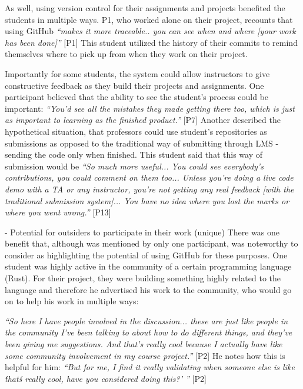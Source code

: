 As well, using version control for their assignments and projects benefited the students in multiple ways. P1, who worked alone on their project, recounts that using GitHub \textit{``makes it more traceable.. you can see when and where [your work has been done]''} [P1] This student utilized the history of their commits to remind themselves where to pick up from when they work on their project.

Importantly for some students, the system could allow instructors to give constructive feedback as they build their projects and assignments. One participant believed that the ability to see the student's process could be important: \textit{``You'd see all the mistakes they made getting there too, which is just as important to learning as the finished product.''} [P7] Another described the hypothetical situation, that professors could use student's repositories as submissions as opposed to the traditional way of submitting through LMS - sending the code only when finished. This student said that this way of submission would be \textit{``So much more useful... You could see everybody's contributions, you could comment on them too... Unless you're doing a live code demo with a TA or any instructor, you're not getting any real feedback [with the traditional submission system]... You have no idea where you lost the marks or where you went wrong.''} [P13]

- Potential for outsiders to participate in their work (unique)
There was one benefit that, although was mentioned by only one participant, was noteworthy to consider as highlighting the potential of using GitHub for these purposes. One student was highly active in the community of a certain programming language (Rust). For their project, they were building something highly related to the language and therefore he advertised his work to the community, who would go on to help his work in multiple ways:

\textit{``So here I have people involved in the discussion... these are just like people in the community I've been talking to about how to do different things, and they've been giving me suggestions. And that's really cool because I actually have like some community involvement in my course project.''} [P2] He notes how this is helpful for him: \textit{``But for me, I find it really validating when someone else is like \'that\'s really cool, have you considered doing this?' ''} [P2]

